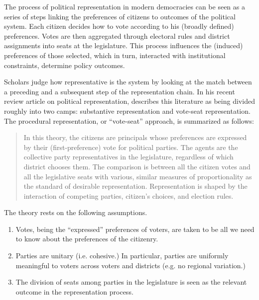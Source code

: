 The process of political representation in modern democracies can be seen as a series of steps linking the preferences of citizens to outcomes of the political system.  Each citizen decides how to vote according to his  (broadly defined) preferences. Votes are then aggregated through electoral rules and district assignments into seats at the legislature. This process influences the (induced) preferences of those selected, which in turn, interacted with institutional constraints,   determine policy outcomes.

\vspace{0.4cm}
\vspace{0.4cm}

Scholars judge how representative is the system by looking at the match between a preceding and a  subsequent step of the representation chain. In his recent review article on  political representation,  \citet{powell:2004} describes this literature as being divided roughly into two camps: substantive representation and vote-seat representation. The procedural representation, or ``vote-seat'' approach,  is  summarized as follows: 

\begin{quote}
In this theory, the citizens are principals whose preferences are expressed by their (first-preference) vote for political parties. The agents are the collective party representatives in the legislature, regardless of which district chooses them. The comparison is between all the citizen votes and all the legislative seats with various, similar measures of proportionality as the standard of desirable representation. Representation is shaped by the interaction of competing parties, citizen's choices, and election rules. \citep[][p.279]{powell:2004}
\end{quote} 

The theory  rests on the following assumptions.

\begin{enumerate}
\item Votes, being the ``expressed'' preferences of voters, are taken to be all  we need to know  about the preferences of the citizenry.
\item Parties are  unitary (i.e. cohesive.) In particular, parties are uniformly meaningful to voters across  voters and districts (e.g. no regional variation.)
\item The division of seats among parties in the legislature is seen as the relevant outcome in the representation process.
\end{enumerate}

